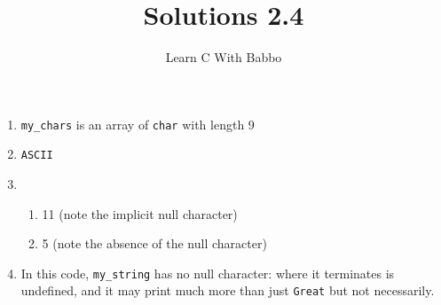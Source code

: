 \documentclass{article}
\begin{document}
\title{Solutions 2.4}
\author{Learn C With Babbo}
\date{}
\maketitle
\begin{enumerate}
\item \verb|my_chars| is an array of \verb|char| with length 9
\item \verb|ASCII|
\item
\begin{enumerate}
\item 11 (note the implicit null character)
\item 5 (note the absence of the null character)
\end{enumerate}
\item In this code, \verb|my_string| has no null character: where it terminates is undefined, and it may print
much more than just \verb|Great| but not necessarily.
\end{enumerate}
\end{document}
